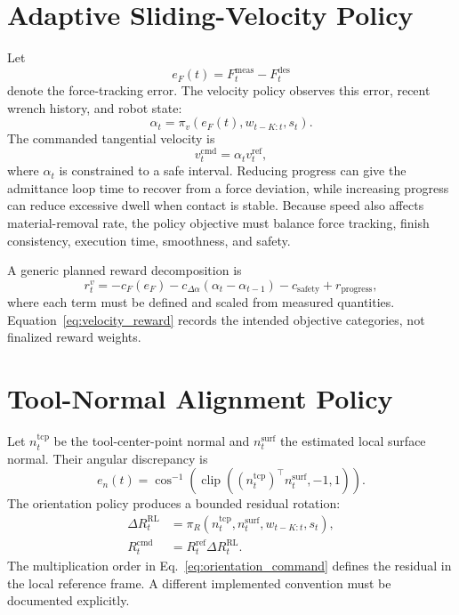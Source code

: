 \section{Adaptive Sliding-Velocity Policy}
Let
\begin{equation}
  e_F(t)=F_t^{\mathrm{meas}}-F_t^{\mathrm{des}}
  \label{eq:force_error}
\end{equation}
denote the force-tracking error. The velocity policy observes this error, recent wrench history, and robot state:
\begin{equation}
  \alpha_t=\pi_v(e_F(t),w_{t-K:t},s_t).
  \label{eq:velocity_residual}
\end{equation}
The commanded tangential velocity is
\begin{equation}
  v_t^{\mathrm{cmd}}=\alpha_t v_t^{\mathrm{ref}},
  \label{eq:velocity_command}
\end{equation}
where \(\alpha_t\) is constrained to a safe interval. Reducing progress can give the admittance loop time to recover from a force deviation, while increasing progress can reduce excessive dwell when contact is stable. Because speed also affects material-removal rate, the policy objective must balance force tracking, finish consistency, execution time, smoothness, and safety.

A generic planned reward decomposition is
\begin{equation}
  r_t^v =
  -c_F(e_F)
  -c_{\Delta\alpha}(\alpha_t-\alpha_{t-1})
  -c_{\mathrm{safety}}
  +r_{\mathrm{progress}},
  \label{eq:velocity_reward}
\end{equation}
where each term must be defined and scaled from measured quantities. Equation~\eqref{eq:velocity_reward} records the intended objective categories, not finalized reward weights.

\section{Tool-Normal Alignment Policy}
Let \(n_t^{\mathrm{tcp}}\) be the tool-center-point normal and \(n_t^{\mathrm{surf}}\) the estimated local surface normal. Their angular discrepancy is
\begin{equation}
  e_n(t)=
  \cos^{-1}\!\left(
  \operatorname{clip}\left(
  (n_t^{\mathrm{tcp}})^\top n_t^{\mathrm{surf}},-1,1
  \right)\right).
  \label{eq:normal_alignment_error}
\end{equation}
The orientation policy produces a bounded residual rotation:
\begin{align}
  \Delta R_t^{\mathrm{RL}}
  &=\pi_R(n_t^{\mathrm{tcp}},n_t^{\mathrm{surf}},w_{t-K:t},s_t),\\
  R_t^{\mathrm{cmd}}
  &=R_t^{\mathrm{ref}}\Delta R_t^{\mathrm{RL}}.
  \label{eq:orientation_command}
\end{align}
The multiplication order in Eq.~\eqref{eq:orientation_command} defines the residual in the local reference frame. A different implemented convention must be documented explicitly.


